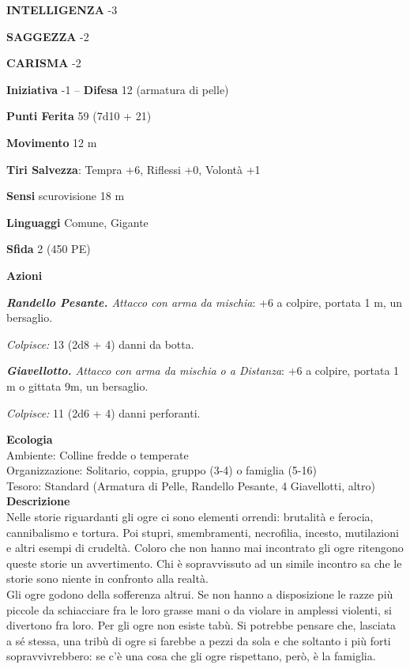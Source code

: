 \begin{multicols}{2}
\textbf{INTELLIGENZA} -3

\textbf{SAGGEZZA} -2

\textbf{CARISMA} -2

\textbf{Iniziativa} -1 -- \textbf{Difesa} 12 (armatura di pelle)

\textbf{Punti Ferita} 59 (7d10 + 21)

\textbf{Movimento} 12 m

\textbf{Tiri Salvezza}: Tempra +6, Riflessi +0, Volontà +1

\textbf{Sensi} scurovisione 18 m

\textbf{Linguaggi} Comune, Gigante

\textbf{Sfida} 2 (450 PE)

\textbf{Azioni}

\emph{\textbf{Randello Pesante.} Attacco con arma da mischia}: +6 a colpire, portata 1 m, un bersaglio.

\emph{Colpisce:} 13 (2d8 + 4) danni da botta. 

\emph{\textbf{Giavellotto.} Attacco con arma da mischia o a Distanza}: +6 a colpire, portata 1 m o gittata 9m, un bersaglio. 

\emph{Colpisce:} 11 (2d6 + 4) danni perforanti.

\textbf{Ecologia}\\
Ambiente: Colline fredde o temperate\\
Organizzazione: Solitario, coppia, gruppo (3-4) o famiglia (5-16)\\
Tesoro: Standard (Armatura di Pelle, Randello Pesante, 4 Giavellotti, altro)\\
\textbf{Descrizione}\\
Nelle storie riguardanti gli ogre ci sono elementi orrendi: brutalità e ferocia, cannibalismo e tortura. Poi stupri, smembramenti, necrofilia, incesto, mutilazioni e altri esempi di crudeltà. Coloro che non hanno mai incontrato gli ogre ritengono queste storie un avvertimento. Chi è sopravvissuto ad un simile incontro sa che le storie sono niente in confronto alla realtà.\\

Gli ogre godono della sofferenza altrui. Se non hanno a disposizione le razze più piccole da schiacciare fra le loro grasse mani o da violare in amplessi violenti, si divertono fra loro. Per gli ogre non esiste tabù. Si potrebbe pensare che, lasciata a sé stessa, una tribù di ogre si farebbe a pezzi da sola e che soltanto i più forti sopravvivrebbero: se c'è una cosa che gli ogre rispettano, però, è la famiglia.\\


\end{multicols}
